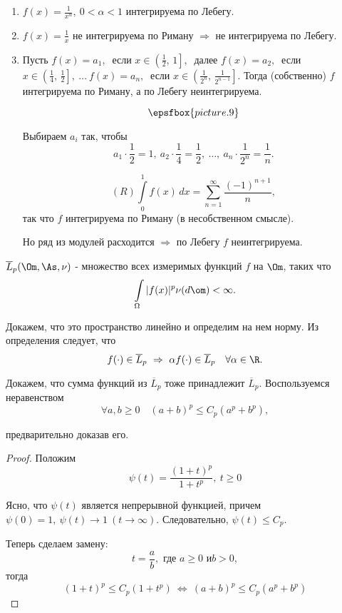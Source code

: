 \documentclass[a4paper]{article}
\newcommand{\io} {\int \limits_{\Omega}}
\newcommand{\sus}{\sum \limits_{n=1}^{\infty} }
\newcommand{\fd} { f(x)\, dx}
\newcommand{\iz} { \int \limits_0^1 }
\begin{document}
\begin{ex}
\begin{enumerate}
\item $f(x)= \frac{1}{x^{\alpha}}, \ 0<\alpha<1$ интегрируема по
Лебегу. \item $f(x) = \frac{1}{x}$ не интегрируема по Риману
$\Rightarrow$ не интегрируема по Лебегу. \item Пусть $f(x) = a_1,\
$ если $x\in \left( \frac12, \, 1 \right],\ $ далее $f(x) = a_2, \
$ если $x\in \left( \frac14, \, \frac12 \right], \ \ldots \ f(x) =
a_n,\ $ если $x\in \left( \frac {1}{2^n}, \, \frac{1}{2^{n-1}}
\right].$ Тогда (собственно) $f$ интегрируема по Риману, а по
Лебегу неинтегрируема.

$$\epsfbox{picture.9}$$

Выбираем $a_i$ так, чтобы $$a_1 \cdot \frac{1}{2}=1, \  a_2 \cdot
\frac{1}{4}=\frac{1}{2},\  \ldots ,\  a_n \cdot \frac{1}{2^n}=
\frac{1}{n}.$$

 $$(R) \iz \fd = \sus \frac{
(-1)^{n+1}}{n},$$ так что $f$ интегрируема по Риману (в
несобственном смысле).

Но ряд из модулей расходится $\Rightarrow $  по Лебегу $f$
неинтегрируема.
\end{enumerate}
\end{ex}
\begin{df}
$\overline{L}_p (\Om, \As, \nu)$ - множество всех
измеримых функций $f$ на $\Om$, таких что $$\io |f(x)|^p \nu
(d\om) < \infty.$$
\end{df}
Докажем, что это пространство линейно и определим на нем норму. Из
определения следует, что
$$f(\cdot) \in \overline{L}_p \
\Rightarrow \  \alpha f(\cdot) \in \overline{L}_p \quad \forall
\alpha \in \R.$$

Докажем, что сумма функций из $\overline{L}_p$ тоже принадлежит
$\overline{L}_p$. Воспользуемся неравенством
$$\forall a,b \geqslant 0  \quad (a+b)^p
\leqslant C_p (a^p + b^p),$$

предварительно доказав его.

\begin{proof}
Положим
$$
\psi (t) = \frac{(1 + t)^p}{1 + t^p}, \ t \geqslant 0
$$

Ясно, что $\psi (t)$ является непрерывной функцией, причем $\psi
(0) = 1, \ \psi(t) \rightarrow 1 \ (t \rightarrow \infty).$
Следовательно, $\psi (t) \leqslant C_p.$

Теперь сделаем замену:
$$t = \frac{a}{b},\mbox{ где } a \geqslant 0 \mbox{ и
} b>0,$$ тогда
$$
(1 + t)^p \leqslant C_p(1 + t^p) \  \Longleftrightarrow \ (a +
b)^p \leqslant C_p (a^p + b^p)
$$
\end{proof}
\end{document}
